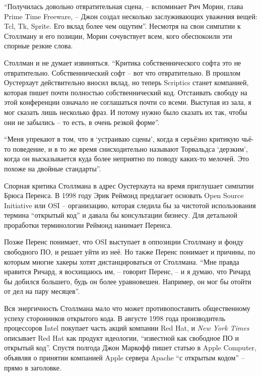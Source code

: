 \enquote{Получилась довольно отвратительная сцена, -- вспоминает Рич Морин, глава Prime Time Freeware, -- Джон создал несколько заслуживающих уважения вещей: Tcl, Tk, Sprite. Его вклад более чем ощутим}. Несмотря на свои симпатии к Столлману и его позиции, Морин сочувствует всем, кого обеспокоили эти спорные резкие слова.

Столлман и не думает извиняться. \enquote{Критика собственнического софта это не отвратительно. Собственнический софт -- вот что отвратительно. В прошлом Оустерхаут действительно вносил вклад, но теперь Scriptics станет компанией, которая пишет почти полностью собственнический код. Отстаивать свободу на этой конференции означало не соглашаться почти со всеми. Выступая из зала, я мог сказать лишь несколько фраз. И потому нужно было сказать их так, чтобы они не забылись -- то есть, в очень резкой форме}.

\enquote{Меня упрекают в том, что я \enquote{устраиваю сцены}, когда я серьёзно критикую чьё-то поведение, и в то же время снисходительно называют Торвальдса \enquote{дерзким}, когда он высказывается куда более неприятно по поводу каких-то мелочей. Это похоже на двойные стандарты}.

Спорная критика Столлмана в адрес Оустерхаута на время приглушает симпатии Брюса Перенса. В 1998 году Эрик Реймонд предлагает основать Open Source Initiative или OSI -- организацию, которая следила бы за чистотой использования термина \enquote{открытый код} и давала бы консультации бизнесу. Для детальной проработки терминологии Реймонд нанимает Перенса.

Позже Перенс понимает, что OSI выступает в оппозиции Столлману и фонду свободного ПО, и решает уйти из неё. Но также Перенс понимает и причины, по которым многие хакеры хотят дистанцироваться от Столлмана. \enquote{Мне правда нравится Ричард, я восхищаюсь им, -- говорит Перенс, -- и я думаю, что Ричард бы добился большего, будь он более уравновешен. Например, он мог бы отойти от дел на пару месяцев}.

Вся энергичность Столлмана мало что может противопоставить общественному успеху сторонников открытого кода. В августе 1998 года производитель процессоров Intel покупает часть акций компании Red Hat, и \textit{New York Times} описывает Red Hat как продукт идеологии, \enquote{известной как свободное ПО и открытый код}. Спустя полгода Джон Маркофф пишет статью в Apple Computer, объявляя о принятии компанией Apple сервера Apache \enquote{с открытым кодом} -- прямо в заголовке. 

